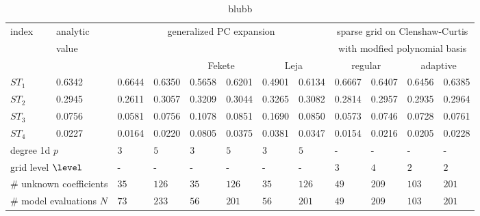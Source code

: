 
\begin{table}[!ht]
  \fontsize{8pt}{3ex}\selectfont
  \renewcommand{\arraystretch}{1.2}
  \begin{tabularx}{\textwidth}{XXXXXXXXXXXX}
    \toprule
    index &
    analytic &
    \multicolumn{6}{c}{generalized PC expansion} &
    \multicolumn{4}{c}{sparse grid on Clenshaw-Curtis} \\
    &
    value &
    & & & & & &
    \multicolumn{4}{c}{with modfied polynomial basis} \\
    \hline
    & &
    \multicolumn{2}{c}{\citet{Sudret08Global}} &
    \multicolumn{2}{c}{Fekete} &
    \multicolumn{2}{c}{Leja} &
    \multicolumn{2}{c}{regular} &
    \multicolumn{2}{c}{adaptive} \\
    \toprule
    $ST_1$ & 0.6342 & 0.6644 & 0.6350 & 0.5658 & 0.6201 & 0.4901 & 0.6134 & 0.6667 & 0.6407 & 0.6456 & 0.6385 \\
    $ST_2$ & 0.2945 & 0.2611 & 0.3057 & 0.3209 & 0.3044 & 0.3265 & 0.3082 & 0.2814 & 0.2957 & 0.2935 & 0.2964 \\
    $ST_3$ & 0.0756 & 0.0581 & 0.0756 & 0.1078 & 0.0851 & 0.1690 & 0.0850 & 0.0573 & 0.0746 & 0.0728 & 0.0761 \\
    $ST_4$ & 0.0227 & 0.0164 & 0.0220 & 0.0805 & 0.0375 & 0.0381 & 0.0347 & 0.0154 & 0.0216 & 0.0205 & 0.0228 \\
    \hline
        \multicolumn{2}{l}{degree 1d $p$} &
    \multicolumn{1}{l}{$3$} &
    \multicolumn{1}{l}{$5$} &
    \multicolumn{1}{l}{$3$} &
    \multicolumn{1}{l}{$5$} &
    \multicolumn{1}{l}{$3$} &
    \multicolumn{1}{l}{$5$} &
    \multicolumn{1}{l}{-} &
    \multicolumn{1}{l}{-} &
    \multicolumn{1}{l}{-} &
    \multicolumn{1}{l}{-} \\
    \multicolumn{2}{l}{grid level $\level$} &
    \multicolumn{1}{l}{-} &
    \multicolumn{1}{l}{-} &
    \multicolumn{1}{l}{-} &
    \multicolumn{1}{l}{-} &
    \multicolumn{1}{l}{-} &
    \multicolumn{1}{l}{-} &
    \multicolumn{1}{l}{$3$} &
    \multicolumn{1}{l}{$4$} &
    \multicolumn{1}{l}{$2$} &
    \multicolumn{1}{l}{$2$} \\
    \multicolumn{2}{l}{\# unknown coefficients} &
    \multicolumn{1}{l}{$35$} &
    \multicolumn{1}{l}{$126$} &
    \multicolumn{1}{l}{$35$} &
    \multicolumn{1}{l}{$126$} &
    \multicolumn{1}{l}{$35$} &
    \multicolumn{1}{l}{$126$} &
    \multicolumn{1}{l}{$49$} &
    \multicolumn{1}{l}{$209$} &
    \multicolumn{1}{l}{$103$} &
    \multicolumn{1}{l}{$201$} \\
    \multicolumn{2}{l}{\# model evaluations $N$} &
    \multicolumn{1}{l}{$73$} &
    \multicolumn{1}{l}{$233$} &
    \multicolumn{1}{l}{$56$} &
    \multicolumn{1}{l}{$201$} &
    \multicolumn{1}{l}{$56$} &
    \multicolumn{1}{l}{$201$} &
    \multicolumn{1}{l}{$49$} &
    \multicolumn{1}{l}{$209$} &
    \multicolumn{1}{l}{$103$} &
    \multicolumn{1}{l}{$201$} \\
    \bottomrule
  \end{tabularx}
  \caption{blubb}
  \label{tab::sobolgfunction-reduced-model-anova}
\end{table}
